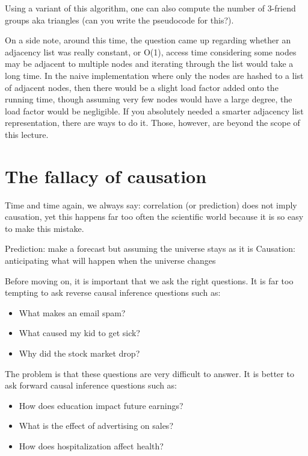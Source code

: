 Using a variant of this algorithm, one can also compute the number of 3-friend groups aka triangles (can you write the pseudocode for this?).

On a side note, around this time, the question came up regarding whether an adjacency list was really constant, or O(1), access time considering some nodes may be adjacent to multiple nodes and iterating through the list would take a long time. In the naive implementation where only the nodes are hashed to a list of adjacent nodes, then there would be a slight load factor added onto the running time, though assuming very few nodes would have a large degree, the load factor would be negligible. If you absolutely needed a smarter adjacency list representation, there are ways to do it. Those, however, are beyond the scope of this lecture.

\section{The fallacy of causation}

Time and time again, we always say: correlation (or prediction) does not imply causation, yet this happens far too often the scientific world because it is so easy to make this mistake.

Prediction: make a forecast but assuming the universe stays as it is
Causation: anticipating what will happen when the universe changes

Before moving on, it is important that we ask the right questions. It is far too tempting to ask reverse causal inference questions such as:

\begin{itemize}
    \item What makes an email spam?
    \item What caused my kid to get sick?
    \item Why did the stock market drop?
\end{itemize}

The problem is that these questions are very difficult to answer. It is better to ask forward causal inference questions such as:

\begin{itemize}
    \item How does education impact future earnings?
    \item What is the effect of advertising on sales?
    \item How does hospitalization affect health?
\end{itemize}

